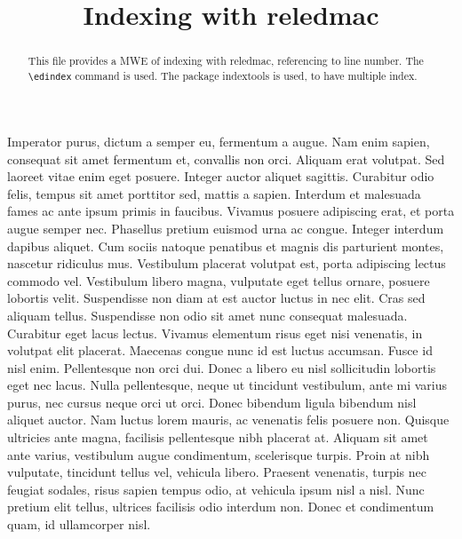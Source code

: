 \documentclass{article}
\begin{document}
\begin{english}
\date{}
\title{Indexing with reledmac}
\maketitle

\begin{abstract}
 This file provides a MWE of indexing with reledmac, referencing to line number.
 The \verb+\edindex+ command is used. The package indextools is used, to have multiple index.
\end{abstract}
\end{english}

\beginnumbering
\pstart
Imperator purus, dictum a semper eu, fermentum a augue. Nam enim sapien, consequat sit amet fermentum et, convallis non orci. Aliquam erat volutpat. Sed laoreet vitae enim eget posuere. Integer auctor aliquet sagittis. Curabitur odio felis, tempus sit amet porttitor sed, mattis a sapien. Interdum et malesuada fames ac ante ipsum primis in faucibus. Vivamus posuere adipiscing erat, et porta augue semper nec.
\pend
\pstart
Phasellus pretium euismod urna ac congue. Integer interdum dapibus aliquet. Cum sociis natoque penatibus et magnis dis parturient montes, nascetur ridiculus mus. Vestibulum placerat volutpat est, porta adipiscing lectus commodo vel. Vestibulum libero magna, vulputate eget tellus ornare, posuere lobortis velit. Suspendisse non diam at est auctor luctus in nec elit. Cras sed aliquam tellus. Suspendisse non odio sit amet nunc consequat malesuada. Curabitur eget lacus lectus. Vivamus elementum risus eget nisi venenatis, in volutpat elit placerat. Maecenas congue nunc id est luctus accumsan. Fusce id nisl enim.
\pend
\pstart
Pellentesque non orci dui. Donec a libero eu nisl sollicitudin lobortis eget nec lacus. Nulla pellentesque, neque ut tincidunt vestibulum, ante mi varius purus, nec cursus neque orci ut orci. Donec bibendum ligula bibendum nisl aliquet auctor. Nam luctus lorem mauris, ac venenatis felis posuere non. Quisque ultricies ante magna, facilisis pellentesque nibh placerat at. Aliquam sit amet ante varius, vestibulum augue condimentum, scelerisque turpis. Proin at nibh vulputate, tincidunt tellus vel, vehicula libero. Praesent venenatis, turpis nec feugiat sodales, risus sapien tempus odio, at vehicula ipsum nisl a nisl. Nunc pretium elit tellus, ultrices facilisis odio interdum non. Donec et condimentum quam, id ullamcorper nisl.
\pend
\endnumbering

\newpage
\printindex

\printindex[name]
\end{document}
